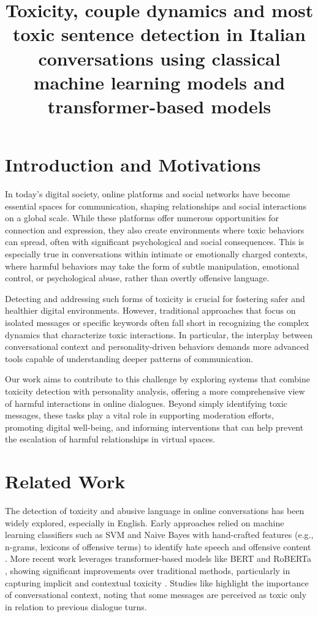 \documentclass[conference]{IEEEtran}
\title{Toxicity, couple dynamics and most toxic sentence detection in Italian conversations using classical machine learning models and transformer-based models}
\author{
\IEEEauthorblockN{Davide Cirilli}
\IEEEauthorblockA{
Università degli Studi di Bari Aldo Moro \\
Email: d.cirilli2@studenti.uniba.it \\
Repo: \url{https://github.com/Davy592/NLP} }
}
\begin{document}
\maketitle
\IEEEdisplaynontitleabstractindextext

\section{Introduction and Motivations}

In today’s digital society, online platforms and social networks have become essential spaces for communication, shaping relationships and social interactions on a global scale. While these platforms offer numerous opportunities for connection and expression, they also create environments where toxic behaviors can spread, often with significant psychological and social consequences. This is especially true in conversations within intimate or emotionally charged contexts, where harmful behaviors may take the form of subtle manipulation, emotional control, or psychological abuse, rather than overtly offensive language.

Detecting and addressing such forms of toxicity is crucial for fostering safer and healthier digital environments. However, traditional approaches that focus on isolated messages or specific keywords often fall short in recognizing the complex dynamics that characterize toxic interactions. In particular, the interplay between conversational context and personality-driven behaviors demands more advanced tools capable of understanding deeper patterns of communication.

Our work aims to contribute to this challenge by exploring systems that combine toxicity detection with personality analysis, offering a more comprehensive view of harmful interactions in online dialogues. Beyond simply identifying toxic messages, these tasks play a vital role in supporting moderation efforts, promoting digital well-being, and informing interventions that can help prevent the escalation of harmful relationships in virtual spaces.

\section{Related Work}

The detection of toxicity and abusive language in online conversations has been widely explored, especially in English. Early approaches relied on machine learning classifiers such as SVM and Naive Bayes with hand-crafted features (e.g., n-grams, lexicons of offensive terms) to identify hate speech and offensive content \cite{AbusiveLanguageDetection2016} \cite{AutomatedHateSpeech2017}. More recent work leverages transformer-based models like BERT \cite{BERT2018} and RoBERTa \cite{RoBERTa2019}, showing significant improvements over traditional methods, particularly in capturing implicit and contextual toxicity \cite{HateSpeechDetectionSurvey2017}. Studies like \cite{ToxicityDetectionContext2021} highlight the importance of conversational context, noting that some messages are perceived as toxic only in relation to previous dialogue turns.
\end{document}
